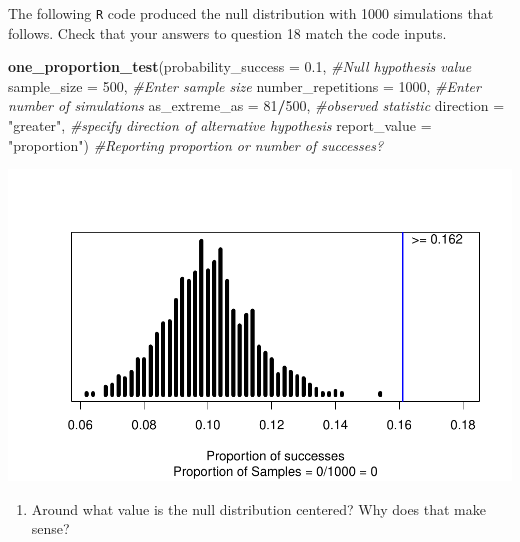 \documentclass[
]{report}
\newenvironment{Shaded}{\begin{snugshade}}{\end{snugshade}}
\newcommand{\CommentTok}[1]{\textcolor[rgb]{0.56,0.35,0.01}{\textit{#1}}}
\newcommand{\DataTypeTok}[1]{\textcolor[rgb]{0.13,0.29,0.53}{#1}}
\newcommand{\DecValTok}[1]{\textcolor[rgb]{0.00,0.00,0.81}{#1}}
\newcommand{\FloatTok}[1]{\textcolor[rgb]{0.00,0.00,0.81}{#1}}
\newcommand{\KeywordTok}[1]{\textcolor[rgb]{0.13,0.29,0.53}{\textbf{#1}}}
\newcommand{\NormalTok}[1]{#1}
\newcommand{\OperatorTok}[1]{\textcolor[rgb]{0.81,0.36,0.00}{\textbf{#1}}}
\newcommand{\StringTok}[1]{\textcolor[rgb]{0.31,0.60,0.02}{#1}}
\providecommand{\tightlist}{%
  \setlength{\itemsep}{0pt}\setlength{\parskip}{0pt}}
\begin{document}
\vspace{.2in}

The following \texttt{R} code produced the null distribution with 1000 simulations that follows. Check that your answers to question 18 match the code inputs.

\begin{Shaded}
\begin{Highlighting}[]
\KeywordTok{one\_proportion\_test}\NormalTok{(}\DataTypeTok{probability\_success =} \FloatTok{0.1}\NormalTok{, }\CommentTok{\#Null hypothesis value}
                    \DataTypeTok{sample\_size =} \DecValTok{500}\NormalTok{, }\CommentTok{\#Enter sample size}
                    \DataTypeTok{number\_repetitions =} \DecValTok{1000}\NormalTok{, }\CommentTok{\#Enter number of simulations}
                    \DataTypeTok{as\_extreme\_as =} \DecValTok{81}\OperatorTok{/}\DecValTok{500}\NormalTok{, }\CommentTok{\#observed statistic}
                    \DataTypeTok{direction =} \StringTok{"greater"}\NormalTok{, }\CommentTok{\#specify direction of alternative hypothesis}
                    \DataTypeTok{report\_value =} \StringTok{"proportion"}\NormalTok{) }\CommentTok{\#Reporting proportion or number of successes?}
\end{Highlighting}
\end{Shaded}

\begin{center}\includegraphics[width=0.7\linewidth]{06-inference-1cat_files/figure-latex/unnamed-chunk-4-1} \end{center}

\newpage

\begin{enumerate}
\def\labelenumi{\arabic{enumi}.}
\setcounter{enumi}{18}
\tightlist
\item
  Around what value is the null distribution centered? Why does that make sense?
\end{enumerate}
\end{document}
